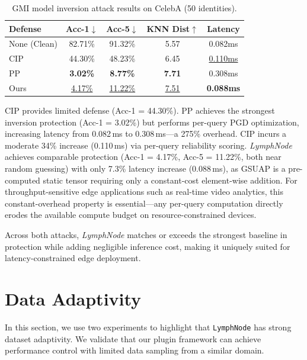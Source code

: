 \documentclass[conference]{IEEEtran}
\begin{document}
\begin{table}[ht]
    \centering
    \caption{GMI model inversion attack results on CelebA (50 identities).}
    \label{tab:inversion}
    \small
    \renewcommand{\arraystretch}{1.2}
    \setlength{\tabcolsep}{6pt}

    \begin{tabular}{lcccc}
        \toprule
        Defense & Acc-1$\downarrow$ & Acc-5$\downarrow$ & KNN Dist$\uparrow$ & Latency \\
        \midrule
        None (Clean)  & 82.71\% & 91.32\% & 5.57 & 0.082ms \\
        CIP           & 44.30\% & 48.23\% & 6.45 & \underline{0.110ms} \\
        PP            &  \textbf{3.02\%} &  \textbf{8.77\%} & \textbf{7.71} & 0.308ms \\
        Ours          &  \underline{4.17\%} &  \underline{11.22\%} & \underline{7.51} & \textbf{0.088ms} \\
        \bottomrule
    \end{tabular}
\end{table}

CIP provides limited defense (Acc-1 = 44.30\%). PP achieves the strongest inversion protection (Acc-1 = 3.02\%) but performs per-query PGD optimization, increasing latency from 0.082\,ms to 0.308\,ms---a 275\% overhead. CIP incurs a moderate 34\% increase (0.110\,ms) via per-query reliability scoring. \textit{LymphNode} achieves comparable protection (Acc-1 = 4.17\%, Acc-5 = 11.22\%, both near random guessing) with only 7.3\% latency increase (0.088\,ms), as GSUAP is a pre-computed static tensor requiring only a constant-cost element-wise addition. For throughput-sensitive edge applications such as real-time video analytics, this constant-overhead property is essential---any per-query computation directly erodes the available compute budget on resource-constrained devices.

Across both attacks, \textit{LymphNode} matches or exceeds the strongest baseline in protection while adding negligible inference cost, making it uniquely suited for latency-constrained edge deployment.


\section{Data Adaptivity}
\label{sec:data adaptivity}

In this section, we use two experiments to highlight that \texttt{LymphNode} has strong dataset adaptivity. We validate that our plugin framework can achieve performance control with limited data sampling from a similar domain.
\end{document}
